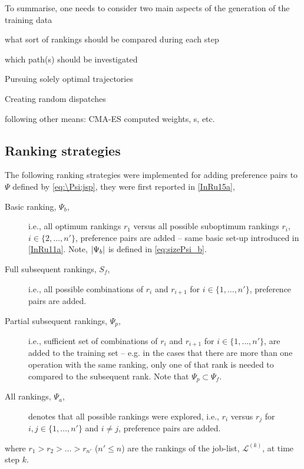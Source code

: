 To summarise, one needs to consider two main aspects of the generation of the 
training data
\begin{enumerate*}[label={\emph{\Roman*})},
    itemjoin={{? }}, itemjoin*={{? And }}, after={{}}]
    \item what sort of rankings should be compared during each step
    \item which path(s) should be investigated
    \begin{enumerate*}[label=\textit{\Roman{enumi}.\roman*)}, before={{? }},
        itemjoin={{? }}, itemjoin*={{? Or }}, after={{}}]
        \item Pursuing solely optimal trajectories
        \item Creating random dispatches
        \item following other means: CMA-ES computed weights, \sdr s, etc.
    \end{enumerate*}
\end{enumerate*}

\subsection{Ranking strategies}\label{sec:trdat:param:ranks}
The following ranking strategies were implemented for adding preference pairs 
to $\Psi$ defined by \cref{eq:\Psi:jsp}, they were first reported in 
\cref{InRu15a},
\begin{description}
    \item[Basic ranking, $\Psi_b$,] i.e., all optimum rankings $r_1$ versus all 
    possible suboptimum rankings $r_i$, $i\in\{2,\ldots,n'\}$, preference pairs 
    are added -- same basic set-up introduced in \cref{InRu11a}. Note, 
    $\lvert\Psi_b\rvert$ is defined in \cref{eq:sizePsi_b}.
    \item[Full subsequent rankings, $S_f$,] i.e., all possible combinations of 
    $r_i$ and $r_{i+1}$ for $i\in\{1,\ldots,n'\}$, preference pairs are added.
    \item[Partial subsequent rankings, $\Psi_p$,] i.e., sufficient set of 
    combinations of $r_i$ and $r_{i+1}$ for $i\in\{1,\ldots,n'\}$, are added to 
    the training set -- e.g. in the cases that there are more than one 
    operation with the same ranking, only one of that rank is needed to 
    compared to the subsequent rank. Note that $\Psi_p\subset \Psi_f$.
    \item[All rankings, $\Psi_a$,] denotes that all possible rankings were 
    explored, i.e.,
    $r_i$ versus $r_j$ for $i,j\in\{1,\ldots,n'\}$ and $i\neq j$, preference 
    pairs are added.
\end{description}
where $r_1>r_2>\ldots>r_{n'}$ ($n'\leq n$) are the rankings of the job-list, 
$\mathcal{L}^{(k)}$, at time step $k$.


